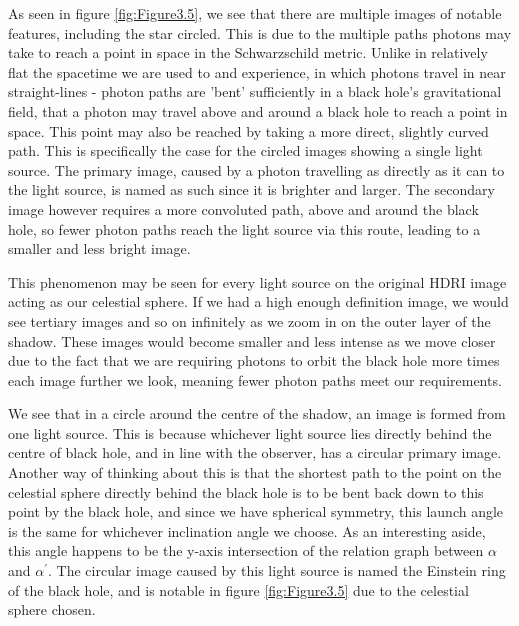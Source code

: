\documentclass[oneside,openright,frontopenright, singlespacing]{dmathesis}
\begin{document}
\vspace{1em}
	As seen in figure \ref{fig:Figure3.5}, we see that there are multiple images of notable features, including the star circled. This is due to the multiple paths photons may take to reach a point in space in the Schwarzschild metric. Unlike in relatively flat the spacetime we are used to and experience, in which photons travel in near straight-lines - photon paths are 'bent' sufficiently in a black hole's gravitational field, that a photon may travel above and around a black hole to reach a point in space. This point may also be reached by taking a more direct, slightly curved path. This is specifically the case for the circled images showing a single light source. The primary image, caused by a photon travelling as directly as it can to the light source, is named as such since it is brighter and larger. The secondary image however requires a more convoluted path, above and around the black hole, so fewer photon paths reach the light source via this route, leading to a smaller and less bright image.

\vspace{1em}
	This phenomenon may be seen for every light source on the original HDRI image acting as our celestial sphere. If we had a high enough definition image, we would see tertiary images and so on infinitely as we zoom in on the outer layer of the shadow. These images would become smaller and less intense as we move closer due to the fact that we are requiring photons to orbit the black hole more times each image further we look, meaning fewer photon paths meet our requirements.

\vspace{1em}
	We see that in a circle around the centre of the shadow, an image is formed from one light source. This is because whichever light source lies directly behind the centre of black hole, and in line with the observer, has a circular primary image. Another way of thinking about this is that the shortest path to the point on the celestial sphere directly behind the black hole is to be bent back down to this point by the black hole, and since we have spherical symmetry, this launch angle is the same for whichever inclination angle we choose. As an interesting aside, this angle happens to be the y-axis intersection of the relation graph between $\alpha$ and $\alpha^{'}$. The circular image caused by this light source is named the Einstein ring of the black hole, and is notable in figure \ref{fig:Figure3.5} due to the celestial sphere chosen.
\end{document}
